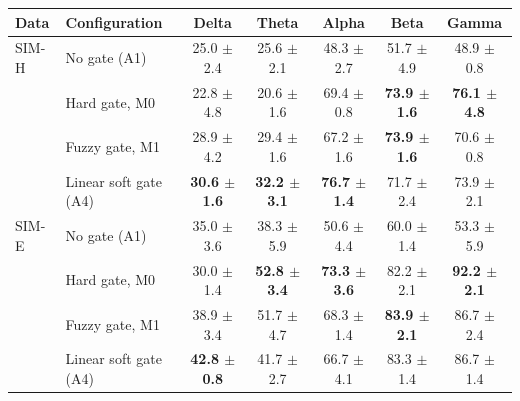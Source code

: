 \begin{tabular}{@{}llccccc@{}}
\toprule
Data & Configuration & Delta & Theta & Alpha & Beta & Gamma\\
\midrule
SIM-H & No gate (A1) & 25.0 $\pm$ 2.4 & 25.6 $\pm$ 2.1 & 48.3 $\pm$ 2.7 & 51.7 $\pm$ 4.9 & 48.9 $\pm$ 0.8\\
 & Hard gate, M0 & 22.8 $\pm$ 4.8 & 20.6 $\pm$ 1.6 & 69.4 $\pm$ 0.8 & \textbf{73.9 $\pm$ 1.6} & \textbf{76.1 $\pm$ 4.8}\\
 & Fuzzy gate, M1 & 28.9 $\pm$ 4.2 & 29.4 $\pm$ 1.6 & 67.2 $\pm$ 1.6 & \textbf{73.9 $\pm$ 1.6} & 70.6 $\pm$ 0.8\\
 & Linear soft gate (A4) & \textbf{30.6 $\pm$ 1.6} & \textbf{32.2 $\pm$ 3.1} & \textbf{76.7 $\pm$ 1.4} & 71.7 $\pm$ 2.4 & 73.9 $\pm$ 2.1\\
\midrule
SIM-E & No gate (A1) & 35.0 $\pm$ 3.6 & 38.3 $\pm$ 5.9 & 50.6 $\pm$ 4.4 & 60.0 $\pm$ 1.4 & 53.3 $\pm$ 5.9\\
 & Hard gate, M0 & 30.0 $\pm$ 1.4 & \textbf{52.8 $\pm$ 3.4} & \textbf{73.3 $\pm$ 3.6} & 82.2 $\pm$ 2.1 & \textbf{92.2 $\pm$ 2.1}\\
 & Fuzzy gate, M1 & 38.9 $\pm$ 3.4 & 51.7 $\pm$ 4.7 & 68.3 $\pm$ 1.4 & \textbf{83.9 $\pm$ 2.1} & 86.7 $\pm$ 2.4\\
 & Linear soft gate (A4) & \textbf{42.8 $\pm$ 0.8} & 41.7 $\pm$ 2.7 & 66.7 $\pm$ 4.1 & 83.3 $\pm$ 1.4 & 86.7 $\pm$ 1.4\\
\bottomrule
\end{tabular}

